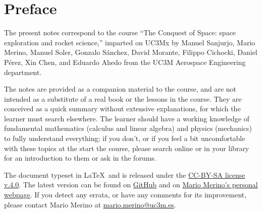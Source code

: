 \section*{Preface}

The present notes correspond to the course ``The Conquest of 
Space: space exploration and rocket science,'' imparted on UC3Mx by
Manuel Sanjurjo,
Mario Merino, 
Manuel Soler,
Gonzalo Sánchez,
David Morante,
Filippo Cichocki,
Daniel Pérez,
Xin Chen, and
Eduardo Ahedo 
from the UC3M Aerospace Engineering department.

The notes are provided as a companion material to the course, and are not
intended as a substitute of a real book or the lessons in the course. They are
conceived as a quick summary without extensive explanations, for which the
learner must search elsewhere.  The learner should have a working  knowledge
of fundamental mathematics (calculus and linear algebra) and physics
(mechanics) to fully understand everything; if you don't, or if you feel a bit
uncomfortable with these topics at the start the course, please search online
or in your library for an introduction to them or ask in the forums.

The document typeset in \LaTeX\ and is released under the 
\href{https://creativecommons.org/licenses/by-nc-sa/4.0/}{CC-BY-SA 
license v.4.0}. The latest version can be found on
\href{https://github.com/Awale/conquest-of-space-notes/}{GitHub} and
on \href{http://mariomerino.uc3m.es/}{Mario Merino's personal webpage}. 
If you detect any errata, or have any comments for its improvement, 
please contact Mario Merino at 
\href{mailto:mario.merino@uc3m.es}{mario.merino@uc3m.es}.


